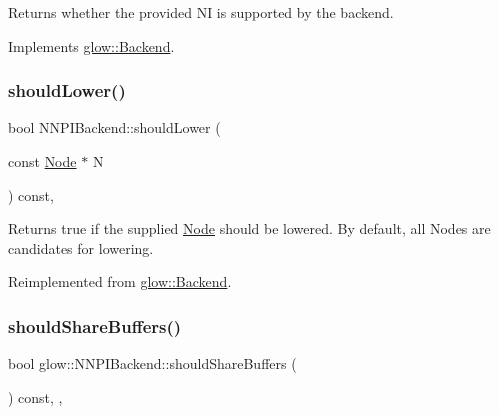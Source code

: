 \begin{DoxyReturn}{Returns}
whether the provided {\ttfamily NI} is supported by the backend. 
\end{DoxyReturn}


Implements \hyperlink{classglow_1_1_backend_a386f7e534956c47f8a6b1457d6e87c67}{glow\+::\+Backend}.

\mbox{\label{classglow_1_1_n_n_p_i_backend_a3e44cab4bf6fa70d239abb2c70a1a465}} 
\subsubsection{\texorpdfstring{should\+Lower()}{shouldLower()}}
{\footnotesize\ttfamily bool N\+N\+P\+I\+Backend\+::should\+Lower (\begin{DoxyParamCaption}\item[{const \hyperlink{classglow_1_1_node}{Node} $\ast$}]{N }\end{DoxyParamCaption}) const\hspace{0.3cm}{\ttfamily [override]}, {\ttfamily [virtual]}}

\begin{DoxyReturn}{Returns}
true if the supplied \hyperlink{classglow_1_1_node}{Node}  should be lowered. By default, all Nodes are candidates for lowering. 
\end{DoxyReturn}


Reimplemented from \hyperlink{classglow_1_1_backend_aba5bec08f5e60626bcc5238f410d632a}{glow\+::\+Backend}.

\mbox{\label{classglow_1_1_n_n_p_i_backend_ae831e2d887416d5ee461f1b898230b66}} 
\subsubsection{\texorpdfstring{should\+Share\+Buffers()}{shouldShareBuffers()}}
{\footnotesize\ttfamily bool glow\+::\+N\+N\+P\+I\+Backend\+::should\+Share\+Buffers (\begin{DoxyParamCaption}{ }\end{DoxyParamCaption}) const\hspace{0.3cm}{\ttfamily [inline]}, {\ttfamily [override]}, {\ttfamily [virtual]}}

